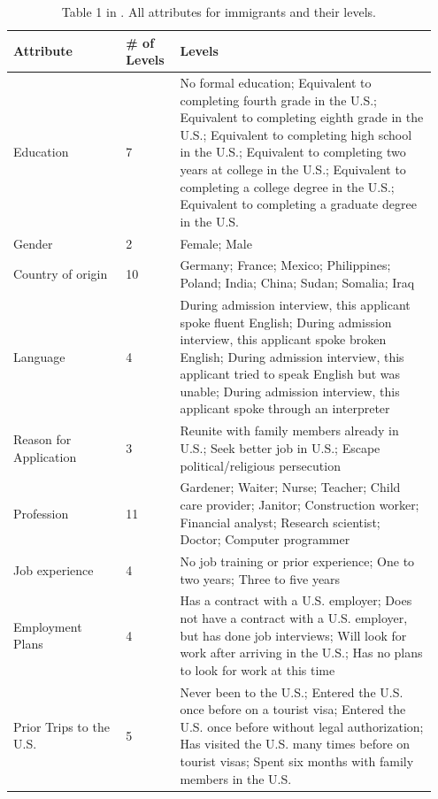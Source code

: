  \begin{table}[ht!]
    \centering\small
    \begin{tabular}{|p{0.25\linewidth}|p{0.12\linewidth}| p{0.58\linewidth}|}
    \hline
    Attribute &\# of Levels & Levels\\
     \hline
    Education & 7 & No formal education; Equivalent to completing fourth grade in the U.S.; Equivalent to completing eighth grade in the U.S.; Equivalent to completing high school in the U.S.; Equivalent to completing two years at college in the U.S.; Equivalent to completing a college degree in the U.S.; Equivalent to completing a graduate degree in the U.S.\\
    Gender & 2 & Female; Male\\
    Country of origin & 10 & Germany; France; Mexico; Philippines; Poland; India; China; Sudan; Somalia; Iraq\\
    Language & 4 & During admission interview, this applicant spoke fluent English; During admission interview, this applicant spoke broken English; During admission interview, this applicant tried to speak English but was unable; During admission interview, this applicant spoke through an interpreter\\
    Reason for Application & 3 &  Reunite with family members already in U.S.; Seek better job in U.S.; Escape political/religious persecution\\
    Profession & 11 & Gardener; Waiter; Nurse; Teacher; Child care provider; Janitor; Construction worker; Financial analyst; Research scientist; Doctor; Computer programmer\\
    Job experience & 4 & No job training or prior experience; One to two years; Three to five years\\
    Employment Plans & 4 & Has a contract with a U.S. employer; Does not have a contract with a U.S. employer, but has done job interviews; Will look for work after arriving in the U.S.; Has no plans to look for work at this time\\
    Prior Trips to the U.S. & 5 & Never been to the U.S.; Entered the U.S. once before on a tourist visa; Entered the U.S. once before without legal authorization; Has visited the U.S. many times before on tourist visas; Spent six months with family members in the U.S.\\
    \hline
    \end{tabular}\caption{Table 1 in \cite{hainmueller2015hidden}. All attributes for immigrants and their levels.}\label{tab:attributes}
\end{table}

